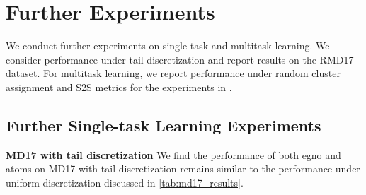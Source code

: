 \section{Further Experiments}
\label{app:further_experiment}
We conduct further experiments on single-task and multitask learning. We consider performance under tail discretization and report results on the RMD17 dataset. For multitask learning, we report performance under random cluster assignment and S2S metrics for the experiments in .

\subsection{Further Single-task Learning Experiments}

\label{app:tail_discretization}
\textbf{MD17 with tail discretization} We find the performance of both \gls{egno} and \gls{atoms} on MD17 with tail discretization remains similar to the performance under uniform discretization discussed in \cref{tab:md17_results}.

